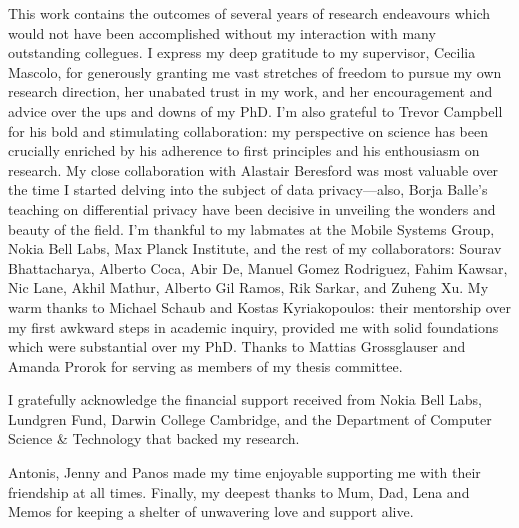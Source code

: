 
\begin{acknowledgements}
This work contains the outcomes of several years of research endeavours which would not have been accomplished without my interaction with many outstanding collegues. I express my deep gratitude to my supervisor, Cecilia Mascolo, for generously granting me vast stretches of freedom to pursue my own research direction, her unabated trust in my work, and her encouragement and advice over the ups and downs of my PhD. I'm also grateful to Trevor Campbell for his bold and stimulating collaboration: my perspective on science has been crucially enriched by his adherence to first principles and his enthousiasm on research. My close collaboration with Alastair Beresford was most valuable over the time I started delving into the subject of data privacy---also, Borja Balle's teaching on differential privacy have been decisive in unveiling the wonders and beauty of the field. I'm thankful to my labmates at the Mobile Systems Group, Nokia Bell Labs, Max Planck Institute, and the rest of my collaborators:
Sourav Bhattacharya, Alberto Coca, Abir De, Manuel Gomez Rodriguez, Fahim Kawsar, Nic Lane,  Akhil Mathur, Alberto Gil Ramos, Rik Sarkar, and Zuheng Xu. My warm thanks to Michael Schaub and Kostas Kyriakopoulos: their mentorship over my first awkward steps in academic inquiry, provided me with solid foundations which were substantial over my PhD. Thanks to
Mattias Grossglauser and Amanda Prorok for serving as members of my thesis committee.

I gratefully acknowledge the financial support received from Nokia Bell Labs, Lundgren Fund, Darwin College Cambridge, and the Department of Computer Science \& Technology that backed my research. 

Antonis, Jenny and Panos made my time enjoyable supporting me with their friendship at all times. Finally, my deepest thanks to Mum, Dad, Lena and Memos for keeping a shelter of unwavering love and support alive.
\end{acknowledgements}
